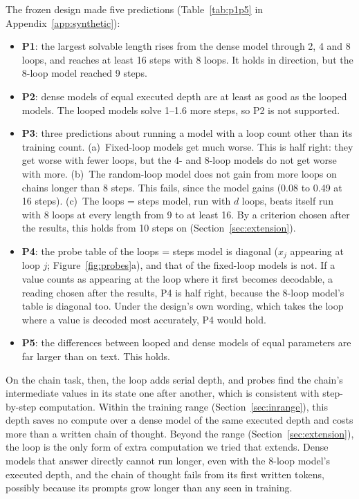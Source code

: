 The frozen design made five predictions (Table~\ref{tab:p1p5} in Appendix~\ref{app:synthetic}):
\begin{itemize}
  \item \textbf{P1}: the largest solvable length rises from the dense model through 2, 4 and 8 loops, and reaches at
  least 16 steps with 8 loops. It holds in direction, but the 8-loop model reached 9 steps.
  \item \textbf{P2}: dense models of equal executed depth are at least as good as the looped models. The looped models
  solve 1--1.6 more steps, so P2 is not supported.
      \item \textbf{P3}: three predictions about running a model with a loop count other than its training count.
  (a)~Fixed-loop models get much worse. This is half right: they get worse with fewer loops, but the 4- and 8-loop
  models do not get worse with more. (b)~The random-loop model does not gain from more loops on chains longer than 8
  steps. This fails, since the model gains (0.08 to 0.49 at 16 steps). (c)~The loops = steps model, run with $d$ loops,
  beats itself run with 8 loops at every length from 9 to at least 16. By a criterion chosen after the results, this
  holds from 10 steps on (Section~\ref{sec:extension}).
  \item \textbf{P4}: the probe table of the loops = steps model is diagonal ($x_j$ appearing at loop $j$;
  Figure~\ref{fig:probes}a), and that of the fixed-loop models is not. If a value counts as appearing at the loop where
  it first becomes decodable, a reading chosen after the results, P4 is half right, because the 8-loop model's table is
  diagonal too. Under the design's own wording, which takes the loop where a value is decoded most accurately, P4 would
  hold.
  \item \textbf{P5}: the differences between looped and dense models of equal parameters are far larger than on text.
  This holds.
\end{itemize}

On the chain task, then, the loop adds serial depth, and probes find the chain's intermediate values in its state one
after another, which is consistent with step-by-step computation. Within the training range
(Section~\ref{sec:inrange}), this depth saves no compute over a dense model of the same executed depth and costs more
than a written chain of thought. Beyond the range (Section~\ref{sec:extension}), the loop is the only form of extra
computation we tried that extends. Dense models that answer directly cannot run longer, even with the 8-loop model's
executed depth, and the chain of thought fails from its first written tokens, possibly because its prompts grow
longer than any seen in training.

